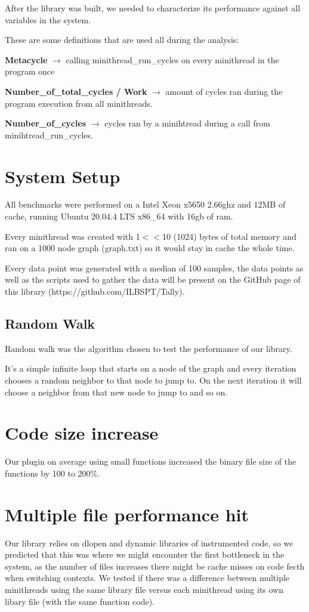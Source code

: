 \documentclass[12pt,a4paper]{report}
\begin{document}
After the library was built, we needed to characterize its performance against all variables in the system.

These are some definitions that are used all during the analysis:

\textbf{ Metacycle } $\rightarrow$ calling minithread\_run\_cycles on every minithread in the program once

\textbf {Number\_of\_total\_cycles / Work } $\rightarrow$ amount of cycles ran during the program execution from all minithreads.

\textbf{ Number\_of\_cycles } $\rightarrow$ cycles ran by a minihtread during a call from minihtread\_run\_cycles.

\section{System Setup}
All benchmarks were performed on a Intel Xeon x5650 2.66ghz and 12MB of cache, running Ubuntu 20.04.4 LTS x86\_64 with 16gb of ram.

Every minithread was created with 1$<<$10 (1024) bytes of total memory and ran  on a 1000 node graph (graph.txt) so it would stay in cache the whole time.

Every data point was generated with a median of 100 samples, the data points as well as the scripts used to gather the data will be present on the GitHub page of this library (https://github.com/ILBSPT/Tally).

\subsection{Random Walk}
Random walk was the algorithm chosen to test the performance of our library. 

It's a simple infinite loop that starts on a node of the graph and every iteration chooses a random neighbor to that node to jump to. On the next iteration it will choose a neighbor from that new node to jump to and so on.   

\section{Code size increase}
Our plugin on average using small functions increased the binary file size of the functions by 100 to 200\%.

\section{Multiple file performance hit}
Our library relies on dlopen and dynamic libraries of instrumented code, so we predicted that this was where we might encounter the first bottleneck in the system, as the number of files increases there might be cache misses on code fecth when switching contexts.
We tested if there was a difference between multiple minithreads using the same library file versus each minithread using its own libary file (with the same function code).
\end{document}
